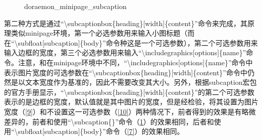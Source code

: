 \documentclass{article}
\begin{document}
\begin{figure}[htbp]
{\begin{minipage}{.25\textwidth}
        \end{minipage}
    }
    \caption{doraemon\_minipage\_subcaption}
    \label{8}
    \end{figure}

    第二种方式是通过``\textbackslash subcaptionbox\{heading\}[width]\{content\}''命令来完成，其原理类似minipage环境，第一个必选参数用来输入小图标题（而在``\textbackslash subfloat[subcaption]\{body\}''命令种这是一个可选参数），第二个可选参数用来输入边框的宽度，第三个必选参数用来输入``\textbackslash includegraphics[options]\{name\}''命令。注意，和在minipage环境中不同，``\textbackslash includegraphics[options]\{name\}''命令中表示图片宽度的可选参数在``\textbackslash subcaptionbox\{heading\}[width]\{content\}''命令中仍然是以文本宽度作为基准的，因此不需要改变其大小。另外，根据subcaption宏包的官方手册显示，``\textbackslash subcaptionbox\{heading\}[width]\{content\}''的第二个可选参数表示的是边框的宽度，默认值就是其中图片的宽度，但是经检验，将其设置为图片宽度（\ref{9}）和不设置这一可选参数（\ref{10}）两种情况下，前者得到的效果是有略微差异的，前者和使用``\textbackslash subcaption\{\}''命令（\ref{8}）的效果相同，后者和使用``\textbackslash subfloat[subcaption]\{body\}''命令（\ref{7}）的效果相同。
\end{document}
